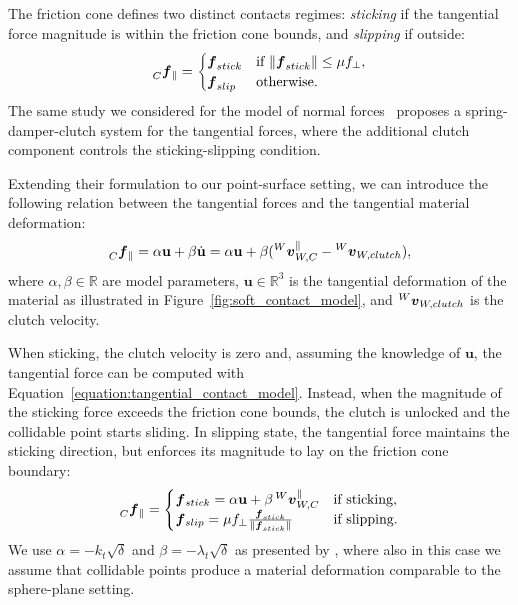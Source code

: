 The friction cone defines two distinct contacts regimes: \emph{sticking} if the tangential force magnitude is within the friction cone bounds, and \emph{slipping} if outside:
%
\begin{equation*}
    \forcelin[C]_\parallel = 
    \begin{cases}
        \boldsymbol{f}_{stick} & \text{if $\norm{\boldsymbol{f}_{stick}} \leq \mu f_\perp$,} \\
        \boldsymbol{f}_{slip} & \text{otherwise.}
    \end{cases}
\end{equation*}
%
The same study we considered for the model of normal forces~\parencite{azad_modeling_2010} proposes a spring-damper-clutch system for the tangential forces, where the additional clutch component controls the sticking-slipping condition.

Extending their formulation to our point-surface setting, we can introduce the following relation between the tangential forces and the tangential material deformation:
%
\begin{equation}
    \label{equation:tangential_contact_model}
    \forcelin[C]_\parallel
    = \alpha \mathbf{u} + \beta \dot{\mathbf{u}}
    = \alpha \mathbf{u} + \beta (\vellin[W]^{\parallel}_{W,C} - \vellin[W]_{W,clutch})
    ,
\end{equation}
%
where $\alpha, \beta \in \mathbb{R}$ are model parameters, $\mathbf{u} \in \mathbb{R}^3$ is the tangential deformation of the material as illustrated in Figure~\ref{fig:soft_contact_model}, and $\vellin[W]_{W,clutch}$ is the clutch velocity.

When sticking, the clutch velocity is zero and, assuming the knowledge of $\mathbf{u}$, the tangential force can be computed with Equation~\eqref{equation:tangential_contact_model}.
Instead, when the magnitude of the sticking force exceeds the friction cone bounds, the clutch is unlocked and the collidable point starts sliding.
In slipping state, the tangential force maintains the sticking direction, but enforces its magnitude to lay on the friction cone boundary:
%
\begin{equation}
    \label{equation:sticking_slipping_forces}
    \forcelin[C]_\parallel =
    \begin{cases}
        \forcelin_{stick} = \alpha \mathbf{u} + \beta \vellin[W]^{\parallel}_{W,C} &\text{if sticking,} \\
        \forcelin_{slip} = \mu f_\perp \frac{\boldsymbol{f}_{stick}}{\norm{\boldsymbol{f}_{stick}}} &\text{if slipping.}
    \end{cases}
\end{equation}
%
We use $\alpha = -k_t\sqrt{\delta}$ and $\beta = -\lambda_t \sqrt{\delta}$ as presented by \textcite{azad_modeling_2010}, where also in this case we assume that collidable points produce a material deformation comparable to the sphere-plane setting.

